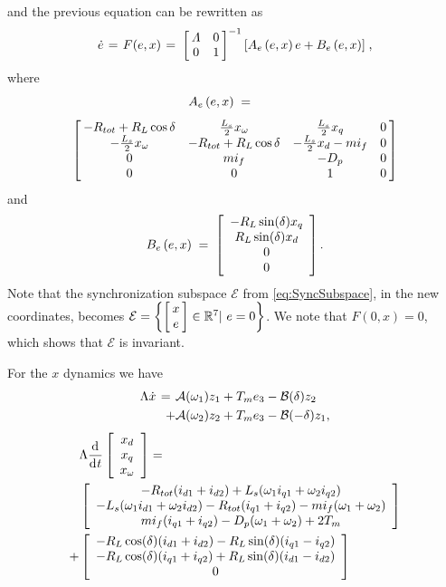 \documentclass[letterpaper,10pt,conference]{ieeeconf}
\newcommand{\BE}{\begin{equation}}
\newcommand{\BEQ}[1]{\BE\label{#1}} %
\newcommand{\rline}  {{\mathbb R}}
\renewcommand{\o}    {{\omega}}
\newcommand{\m}      {{\hbox{\hskip 1pt}}}
\newcommand{\nm}     {{\hbox{\hskip -3pt}}}
\newcommand{\dd}     {{\rm d\hbox{\hskip 0.5pt}}}
\newcommand{\Amscr}  {{\mathcal{A}}}
\newcommand{\Bmscr}  {{\mathcal{B}}}
\newcommand{\Emscr}  {{\mathcal{E}}}
\begin{document}
and the previous equation can be rewritten as \vspace{-1mm}
\BEQ{Hariri}
   \dot{e} \m=\m F(e,x) \m=\m \left[\nm\begin{array}{cc} \varLambda 
   & 0\\ 0 & 1 \end{array}\nm\right]^{-1} \left[A_e\left(e,x\right) 
   e + B_e \left(e,x\right) \right] \m,
\end{equation}
where 
$$ A_e\left(e,x\right) \m=\qquad\m$$
$$ \left[\nm\begin{array}{cccc}
   -R_{tot}+R_L\cos\delta & \frac{L_s}{2} x_{\o} & \frac{L_s}{2}
   x_q & 0\\ -\frac{L_s}{2} x_{\o} & -R_{tot} + R_L\cos\delta & 
   -\frac{L_s}{2} x_d - mi_f & 0\\ 0 & mi_f & -D_p & 0\\
   0 & 0 & 1 & 0 \end{array} \nm\right]$$ 
and
$$ B_e\left(e,x\right) \m=\m \left[\begin{array}{c} -R_L\sin(\delta)
   x_q\\ R_L\sin(\delta) x_d\\ 0\\ 0 \end{array}\right].$$
Note that the synchronization subspace $\Emscr$ from 
\eqref{eq:SyncSubspace}, in the new coordinates, becomes
$\Emscr=\left\{\left[\nm\begin{array}{c}x\\ e\end{array}\nm\right] 
\in\rline^7|\ e=0 \right\}$. We note that $F(0,x)=0$, which shows 
that $\Emscr$ is invariant.

For the $x$ dynamics we have
$$ \begin{aligned} \Lambda\dot{x} \m=\m & \Amscr(\o_1) z_1 + T_m e_3
   -\Bmscr(\delta) z_2\\ +& \Amscr(\o_2) z_2 + T_m e_3-\Bmscr
   (-\delta) z_1, \end{aligned}$$
\vspace{-2mm}
$$ \begin{aligned} &\Lambda\frac{\dd}{\dd t}\left[\begin{array}{c}
   x_{d}\\ x_{q}\\ x_{\o} \end{array}\right] = \\
   & \left[\begin{array}{c} - R_{tot}(i_{d1}+i_{d2})+L_s(\o_1 i_{q1}
   +\o_2 i_{q2})\\ -L_s(\o_1 i_{d1}+\o_2 i_{d2})-R_{tot}(i_{q1} +
   i_{q2})-m i_f(\o_1+\o_2)\\ m i_f(i_{q1}+i_{q2})-D_p(\o_1+\o_2) +
   2T_m \end{array}\right]\\ +& \left[ \begin{array}{c}
   -R_L\cos(\delta)(i_{d1}+i_{d2})-R_L\sin(\delta)(i_{q1}-i_{q2})\\
   -R_L\cos(\delta)(i_{q1}+i_{q2})+R_L\sin(\delta)(i_{d1}-i_{d2})\\
   0 \end{array}\right] \end{aligned}$$
\end{document}
